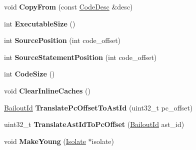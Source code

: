 \begin{DoxyCompactItemize}
\item 
void {\bfseries Copy\+From} (const \hyperlink{structv8_1_1internal_1_1_code_desc}{Code\+Desc} \&desc)\hypertarget{classv8_1_1internal_1_1_code_a070b438428dcfba2657304cf154ad408}{}\label{classv8_1_1internal_1_1_code_a070b438428dcfba2657304cf154ad408}

\item 
int {\bfseries Executable\+Size} ()\hypertarget{classv8_1_1internal_1_1_code_a4be90b2cf174cc356edba9e06c83a569}{}\label{classv8_1_1internal_1_1_code_a4be90b2cf174cc356edba9e06c83a569}

\item 
int {\bfseries Source\+Position} (int code\+\_\+offset)\hypertarget{classv8_1_1internal_1_1_code_a48f3e415574b702b4134ac00fbce57aa}{}\label{classv8_1_1internal_1_1_code_a48f3e415574b702b4134ac00fbce57aa}

\item 
int {\bfseries Source\+Statement\+Position} (int code\+\_\+offset)\hypertarget{classv8_1_1internal_1_1_code_ae5316504ada047fa36b218512e49c05c}{}\label{classv8_1_1internal_1_1_code_ae5316504ada047fa36b218512e49c05c}

\item 
int {\bfseries Code\+Size} ()\hypertarget{classv8_1_1internal_1_1_code_a470d5feff99f57f2327150c5cbb582aa}{}\label{classv8_1_1internal_1_1_code_a470d5feff99f57f2327150c5cbb582aa}

\item 
void {\bfseries Clear\+Inline\+Caches} ()\hypertarget{classv8_1_1internal_1_1_code_aaf76a2343d83049d637d9d5915321cfa}{}\label{classv8_1_1internal_1_1_code_aaf76a2343d83049d637d9d5915321cfa}

\item 
\hyperlink{classv8_1_1internal_1_1_bailout_id}{Bailout\+Id} {\bfseries Translate\+Pc\+Offset\+To\+Ast\+Id} (uint32\+\_\+t pc\+\_\+offset)\hypertarget{classv8_1_1internal_1_1_code_a346509df67531778e571d32b031a687f}{}\label{classv8_1_1internal_1_1_code_a346509df67531778e571d32b031a687f}

\item 
uint32\+\_\+t {\bfseries Translate\+Ast\+Id\+To\+Pc\+Offset} (\hyperlink{classv8_1_1internal_1_1_bailout_id}{Bailout\+Id} ast\+\_\+id)\hypertarget{classv8_1_1internal_1_1_code_a100bbeaf8fcf8e8608d20ce2b364ad2e}{}\label{classv8_1_1internal_1_1_code_a100bbeaf8fcf8e8608d20ce2b364ad2e}

\item 
void {\bfseries Make\+Young} (\hyperlink{classv8_1_1internal_1_1_isolate}{Isolate} $\ast$isolate)\hypertarget{classv8_1_1internal_1_1_code_a7cd9726b52ac5e8f5ea87f87fa0049bb}{}\label{classv8_1_1internal_1_1_code_a7cd9726b52ac5e8f5ea87f87fa0049bb}


\end{DoxyCompactItemize}
